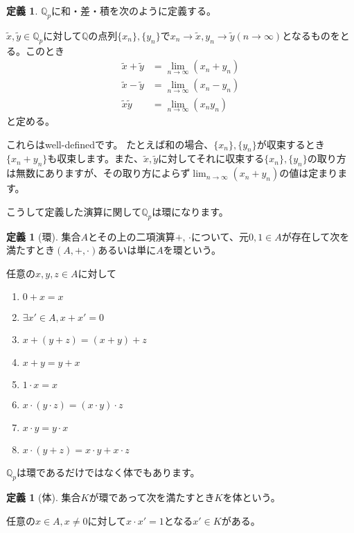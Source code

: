 \documentclass[uplatex]{jsarticle}
\newcommand{\Q}{\mathbb{Q}}
\theoremstyle{definition} %
\newtheorem{defi}[thm]{定義}
\begin{document}
\begin{oframed}\begin{defi}
$\Q_p$に和・差・積を次のように定義する。

$\tilde{x}, \tilde{y} \in \Q_p$に対して$\Q$の点列$\{x_n\}, \{y_n\}$で$x_n \to \tilde{x}, y_n \to \tilde{y} (n \to \infty)$となるものをとる。このとき
\begin{align*}
\tilde{x} + \tilde{y} &= \lim_{n\to\infty} (x_n + y_n) \\
\tilde{x} - \tilde{y} &= \lim_{n\to\infty} (x_n - y_n) \\
\tilde{x} \tilde{y} &= \lim_{n\to\infty} (x_n y_n)
\end{align*}
と定める。
\end{defi}\end{oframed}

これらはwell-definedです。
たとえば和の場合、$\{x_n\}, \{y_n\}$が収束するとき$\{x_n + y_n\}$も収束します。また、$\tilde{x}, \tilde{y}$に対してそれに収束する$\{x_n\}, \{y_n\}$の取り方は無数にありますが、その取り方によらず$\lim_{n\to\infty} (x_n + y_n)$の値は定まります。

こうして定義した演算に関して$\Q_p$は環になります。

\begin{oframed}\begin{defi}[環]
集合$A$とその上の二項演算$+$, $\cdot$について、元$0, 1 \in A$が存在して次を満たすとき$(A, +, \cdot)$あるいは単に$A$を環という。

任意の$x, y, z \in A$に対して
\begin{enumerate}
\item $0 + x = x$
\item $\exists x'\in A, x + x' = 0$
\item $x + (y + z) = (x + y) + z$
\item $x + y = y + x$
\item $1 \cdot x = x$
\item $x \cdot (y \cdot z) = (x \cdot y) \cdot z$
\item $x \cdot y = y \cdot x$
\item $x \cdot (y + z) = x \cdot y + x \cdot z$
\end{enumerate}
\end{defi}\end{oframed}

$\Q_p$は環であるだけではなく体でもあります。

\begin{oframed}\begin{defi}[体]
集合$K$が環であって次を満たすとき$K$を体という。

任意の$x \in A, x \ne 0$に対して$x \cdot x' = 1$となる$x' \in K$がある。
\end{defi}\end{oframed}
\end{document}
